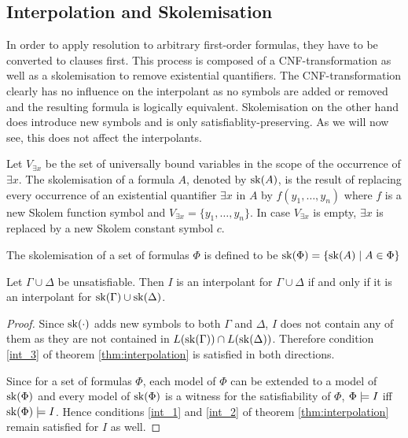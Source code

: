 \subsection{Interpolation and Skolemisation}

In order to apply resolution to arbitrary first-order formulas, they have to be converted to clauses first.
This process is composed of a CNF-transformation as well as a skolemisation to remove existential quantifiers.
The CNF-transformation clearly has no influence on the interpolant as no symbols are added or removed and the resulting formula is logically equivalent.
Skolemisation on the other hand does introduce new symbols and is only satisfiablity-preserving. As we will now see, this does not affect the interpolants.

\begin{defi}
	Let $V_{\exists x}$ be the set of universally bound variables in the scope of the occurrence of $\exists x$.
	The skolemisation of a formula $A$, denoted by $\mathrm{sk}(A)$, is the result of replacing every occurrence of an existential quantifier $\exists x$ in $A$ by $f(y_1, \ldots, y_n)$ where $f$ is a new Skolem function symbol and $V_{\exists x} = \{y_1, \ldots, y_n\}$.
	In case $V_{\exists x}$ is empty, $\exists x$ is replaced by a new Skolem constant symbol $c$.

	The skolemisation of a set of formulas $\Phi$ is defined to be $\mathrm{sk}(\Phi) = \{ \mathrm{sk}(A) \mid A \in \Phi \}$
\end{defi}


\begin{prop}
	Let $\Gamma \cup \Delta$ be unsatisfiable.
	Then $I$ is an interpolant for $\Gamma \cup \Delta$ if and only if it is an interpolant for $\mathrm{sk}(\Gamma) \cup \mathrm{sk}(\Delta)$. 
\end{prop}

\begin{proof}
	Since $\mathrm{sk}(\cdot)$ adds new symbols to both $\Gamma$ and $\Delta$, $I$ does not contain any of them as they are not contained in $L(\mathrm{sk}(\Gamma)) \cap L(\mathrm{sk}(\Delta))$.
	Therefore condition \ref{int_3} of theorem \ref{thm:interpolation} is satisfied in both directions.

	Since for a set of formulas $\Phi$, each model of $\Phi$ can be extended to a model of $\mathrm{sk}(\Phi)$ and every model of $\mathrm{sk}(\Phi)$ is a witness for the satisfiability of $\Phi$, $\Phi \models I$ iff $\mathrm{sk}(\Phi) \models I$.
	Hence conditions \ref{int_1} and \ref{int_2} of theorem \ref{thm:interpolation} remain satisfied for $I$ as well.
\end{proof}



